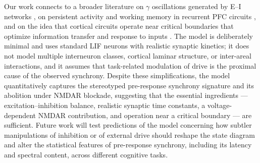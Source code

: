 \documentclass[11pt]{article}
\begin{document}
Our work connects to a broader literature on $\gamma$ oscillations generated by E--I networks \citep{brunel1999fast,buzsaki2012mechanisms,cardin2009driving,sohal2009parvalbumin,fries2007gamma}, on persistent activity and working memory in recurrent PFC circuits \citep{wang1999synaptic,compte2000synaptic,goldmanrakic1995cellular}, and on the idea that cortical circuits operate near critical boundaries that optimize information transfer and response to inputs \citep{beggs2003neuronal}. The model is deliberately minimal and uses standard LIF neurons with realistic synaptic kinetics; it does not model multiple interneuron classes, cortical laminar structure, or inter-areal interactions, and it assumes that task-related modulation of drive is the proximal cause of the observed synchrony. Despite these simplifications, the model quantitatively captures the stereotyped pre-response synchrony signature and its abolition under NMDAR blockade, suggesting that the essential ingredients --- excitation--inhibition balance, realistic synaptic time constants, a voltage-dependent NMDAR contribution, and operation near a critical boundary --- are sufficient. Future work will test predictions of the model concerning how subtler manipulations of inhibition or of external drive should reshape the state diagram and alter the statistical features of pre-response synchrony, including its latency and spectral content, across different cognitive tasks.



\end{document}
